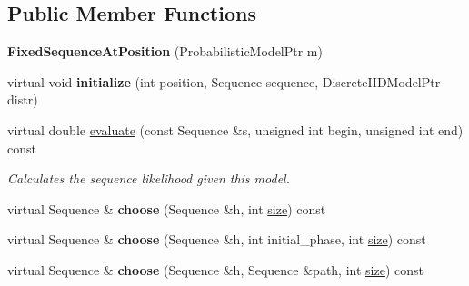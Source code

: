 \subsection*{Public Member Functions}
\begin{DoxyCompactItemize}
\item 
\mbox{\label{classtops_1_1FixedSequenceAtPosition_afc84dd484d286f246a7536d6f50feb93}} 
{\bfseries Fixed\+Sequence\+At\+Position} (Probabilistic\+Model\+Ptr m)
\item 
\mbox{\label{classtops_1_1FixedSequenceAtPosition_a5337554ef494d0dce741580266b8cbbd}} 
virtual void {\bfseries initialize} (int position, Sequence sequence, Discrete\+I\+I\+D\+Model\+Ptr distr)
\item 
\mbox{\label{classtops_1_1FixedSequenceAtPosition_a18c28305c607a6d0a4699dd5244ad8d0}} 
virtual double \hyperlink{classtops_1_1FixedSequenceAtPosition_a18c28305c607a6d0a4699dd5244ad8d0}{evaluate} (const Sequence \&s, unsigned int begin, unsigned int end) const
\begin{DoxyCompactList}\small\item\em Calculates the sequence likelihood given this model. \end{DoxyCompactList}\item 
\mbox{\label{classtops_1_1FixedSequenceAtPosition_a3e50c13ff092961851feadd5f345943e}} 
virtual Sequence \& {\bfseries choose} (Sequence \&h, int \hyperlink{classtops_1_1ProbabilisticModel_a4e3910e9b9b848b7078e7101909ae82a}{size}) const
\item 
\mbox{\label{classtops_1_1FixedSequenceAtPosition_a90c619825f8973acc053f2b3fee35497}} 
virtual Sequence \& {\bfseries choose} (Sequence \&h, int initial\+\_\+phase, int \hyperlink{classtops_1_1ProbabilisticModel_a4e3910e9b9b848b7078e7101909ae82a}{size}) const
\item 
\mbox{\label{classtops_1_1FixedSequenceAtPosition_a25deb5048f3e1dd278a923c2bfce50bf}} 
virtual Sequence \& {\bfseries choose} (Sequence \&h, Sequence \&path, int \hyperlink{classtops_1_1ProbabilisticModel_a4e3910e9b9b848b7078e7101909ae82a}{size}) const

\end{DoxyCompactItemize}
